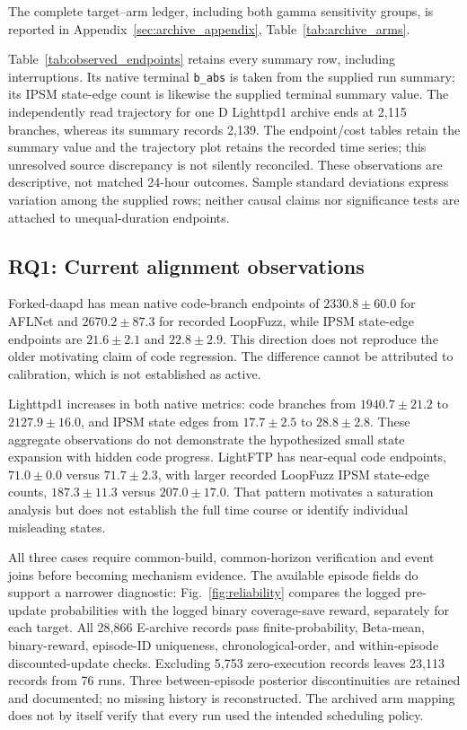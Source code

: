 \documentclass[final,5p,times,number]{elsarticle}
\newcommand{\figref}[1]{Fig.~\ref{#1}}
\begin{document}

The complete target--arm ledger, including both gamma sensitivity groups, is reported in Appendix~\ref{sec:archive_appendix}, Table~\ref{tab:archive_arms}.

Table~\ref{tab:observed_endpoints} retains every summary row, including interruptions. Its native terminal \texttt{b\_abs} is taken from the supplied run summary; its IPSM state-edge count is likewise the supplied terminal summary value. The independently read trajectory for one D Lighttpd1 archive ends at 2,115 branches, whereas its summary records 2,139. The endpoint/cost tables retain the summary value and the trajectory plot retains the recorded time series; this unresolved source discrepancy is not silently reconciled. These observations are descriptive, not matched 24-hour outcomes. Sample standard deviations express variation among the supplied rows; neither causal claims nor significance tests are attached to unequal-duration endpoints.

\subsection{RQ1: Current alignment observations}
Forked-daapd has mean native code-branch endpoints of $2330.8\pm60.0$ for AFLNet and $2670.2\pm87.3$ for recorded LoopFuzz, while IPSM state-edge endpoints are $21.6\pm2.1$ and $22.8\pm2.9$. This direction does not reproduce the older motivating claim of code regression. The difference cannot be attributed to calibration, which is not established as active.

Lighttpd1 increases in both native metrics: code branches from $1940.7\pm21.2$ to $2127.9\pm16.0$, and IPSM state edges from $17.7\pm2.5$ to $28.8\pm2.8$. These aggregate observations do not demonstrate the hypothesized small state expansion with hidden code progress. LightFTP has near-equal code endpoints, $71.0\pm0.0$ versus $71.7\pm2.3$, with larger recorded LoopFuzz IPSM state-edge counts, $187.3\pm11.3$ versus $207.0\pm17.0$. That pattern motivates a saturation analysis but does not establish the full time course or identify individual misleading states.

All three cases require common-build, common-horizon verification and event joins before becoming mechanism evidence. The available episode fields do support a narrower diagnostic: \figref{fig:reliability} compares the logged pre-update probabilities with the logged binary coverage-save reward, separately for each target. All 28,866 E-archive records pass finite-probability, Beta-mean, binary-reward, episode-ID uniqueness, chronological-order, and within-episode discounted-update checks. Excluding 5,753 zero-execution records leaves 23,113 records from 76 runs. Three between-episode posterior discontinuities are retained and documented; no missing history is reconstructed. The archived arm mapping does not by itself verify that every run used the intended scheduling policy.
\end{document}
